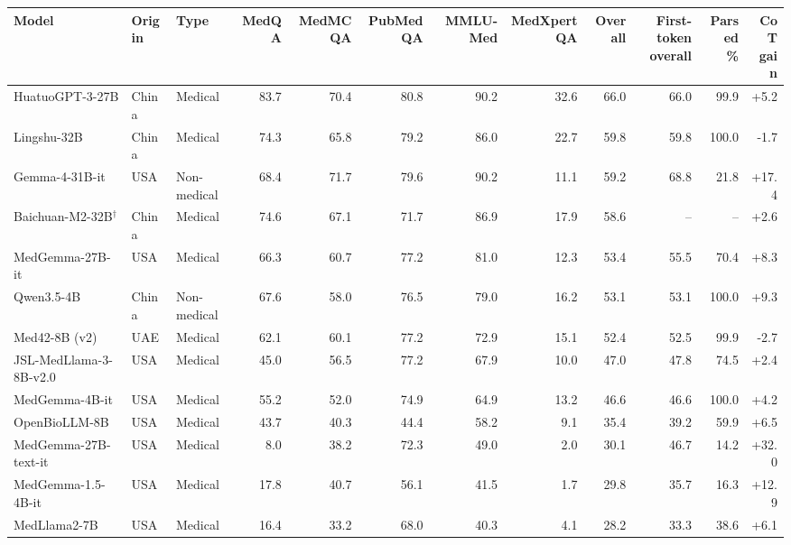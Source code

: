 \begin{tabular}{@{}lllrrrrrrrrr@{}}
\toprule
Model & Origin & Type & MedQA & MedMCQA & PubMedQA & MMLU-Med & MedXpertQA & Overall & \thead{First-token\\overall} & \thead{Parsed\\\%} & \thead{CoT\\gain} \\
\midrule
HuatuoGPT-3-27B & China & Medical & 83.7 & 70.4 & 80.8 & 90.2 & 32.6 & 66.0 & 66.0 & 99.9 & +5.2 \\
Lingshu-32B & China & Medical & 74.3 & 65.8 & 79.2 & 86.0 & 22.7 & 59.8 & 59.8 & 100.0 & -1.7 \\
Gemma-4-31B-it & USA & Non-medical & 68.4 & 71.7 & 79.6 & 90.2 & 11.1 & 59.2 & 68.8 & 21.8 & +17.4 \\
Baichuan-M2-32B$^{\dagger}$ & China & Medical & 74.6 & 67.1 & 71.7 & 86.9 & 17.9 & 58.6 & -- & -- & +2.6 \\
MedGemma-27B-it & USA & Medical & 66.3 & 60.7 & 77.2 & 81.0 & 12.3 & 53.4 & 55.5 & 70.4 & +8.3 \\
Qwen3.5-4B & China & Non-medical & 67.6 & 58.0 & 76.5 & 79.0 & 16.2 & 53.1 & 53.1 & 100.0 & +9.3 \\
Med42-8B (v2) & UAE & Medical & 62.1 & 60.1 & 77.2 & 72.9 & 15.1 & 52.4 & 52.5 & 99.9 & -2.7 \\
JSL-MedLlama-3-8B-v2.0 & USA & Medical & 45.0 & 56.5 & 77.2 & 67.9 & 10.0 & 47.0 & 47.8 & 74.5 & +2.4 \\
MedGemma-4B-it & USA & Medical & 55.2 & 52.0 & 74.9 & 64.9 & 13.2 & 46.6 & 46.6 & 100.0 & +4.2 \\
OpenBioLLM-8B & USA & Medical & 43.7 & 40.3 & 44.4 & 58.2 & 9.1 & 35.4 & 39.2 & 59.9 & +6.5 \\
MedGemma-27B-text-it & USA & Medical & 8.0 & 38.2 & 72.3 & 49.0 & 2.0 & 30.1 & 46.7 & 14.2 & +32.0 \\
MedGemma-1.5-4B-it & USA & Medical & 17.8 & 40.7 & 56.1 & 41.5 & 1.7 & 29.8 & 35.7 & 16.3 & +12.9 \\
MedLlama2-7B & USA & Medical & 16.4 & 33.2 & 68.0 & 40.3 & 4.1 & 28.2 & 33.3 & 38.6 & +6.1 \\
\bottomrule
\end{tabular}
